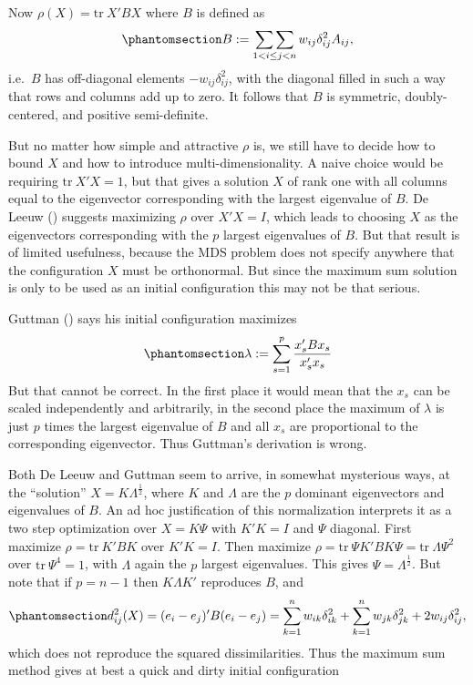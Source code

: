 \documentclass[
  12pt,
  letterpaper,
  DIV=11,
  numbers=noendperiod]{scrartcl}
\begin{document}
Now \(\rho(X)=\text{tr}\ X'BX\) where \(B\) is defined as
\begin{equation}\phantomsection\label{eq-bdef}{
B:=\mathop{\sum\sum}_{1<i\leq j<n} w_{ij}\delta_{ij}^2A_{ij},
}\end{equation} i.e.~\(B\) has off-diagonal elements
\(-w_{ij}\delta_{ij}^2\), with the diagonal filled in such a way that
rows and columns add up to zero. It follows that \(B\) is symmetric,
doubly-centered, and positive semi-definite.

But no matter how simple and attractive \(\rho\) is, we still have to
decide how to bound \(X\) and how to introduce multi-dimensionality. A
naive choice would be requiring \(\text{tr}\ X'X=1\), but that gives a
solution \(X\) of rank one with all columns equal to the eigenvector
corresponding with the largest eigenvalue of \(B\). De Leeuw
() suggests maximizing \(\rho\) over
\(X'X=I\), which leads to choosing \(X\) as the eigenvectors
corresponding with the \(p\) largest eigenvalues of \(B\). But that
result is of limited usefulness, because the MDS problem does not
specify anywhere that the configuration \(X\) must be orthonormal. But
since the maximum sum solution is only to be used as an initial
configuration this may not be that serious.

Guttman () says his initial configuration
maximizes \begin{equation}\phantomsection\label{eq-guttmaxsum}{
\lambda:=\sum_{s=1}^p\frac{x_s'Bx_s}{x_s'x_s}
}\end{equation} But that cannot be correct. In the first place it would
mean that the \(x_s\) can be scaled independently and arbitrarily, in
the second place the maximum of \(\lambda\) is just \(p\) times the
largest eigenvalue of \(B\) and all \(x_s\) are proportional to the
corresponding eigenvector. Thus Guttman's derivation is wrong.

Both De Leeuw and Guttman seem to arrive, in somewhat mysterious ways,
at the ``solution'' \(X=K\Lambda^\frac12\), where \(K\) and \(\Lambda\)
are the \(p\) dominant eigenvectors and eigenvalues of \(B\). An ad hoc
justification of this normalization interprets it as a two step
optimization over \(X=K\Psi\) with \(K'K=I\) and \(\Psi\) diagonal.
First maximize \(\rho=\text{tr}\ K'BK\) over \(K'K=I\). Then maximize
\(\rho=\text{tr}\ \Psi K'BK\Psi=\text{tr}\ \Lambda\Psi^2\) over
\(\text{tr}\ \Psi^4=1\), with \(\Lambda\) again the \(p\) largest
eigenvalues. This gives \(\Psi=\Lambda^\frac12\). But note that if
\(p=n-1\) then \(K\Lambda K'\) reproduces \(B\), and
\begin{equation}\phantomsection\label{eq-maxsumrep}{
d_{ij}^2(X)=(e_i-e_j)'B(e_i-e_j)=\sum_{k=1}^nw_{ik}\delta_{ik}^2+\sum_{k=1}^nw_{jk}\delta_{jk}^2+2w_{ij}\delta_{ij}^2,
}\end{equation} which does not reproduce the squared dissimilarities.
Thus the maximum sum method gives at best a quick and dirty initial
configuration
\end{document}
